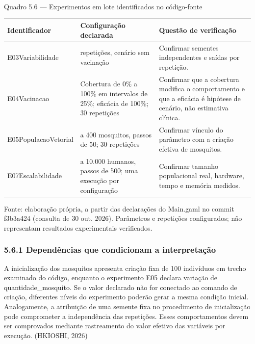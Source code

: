 Quadro 5.6 --- Experimentos em lote identificados no código-fonte

\begin{longtable}[]{@{}
  >{\raggedright\arraybackslash}p{}
  >{\raggedright\arraybackslash}p{}
  >{\raggedright\arraybackslash}p{}@{}}
\toprule\noalign{}
\begin{minipage}[b]{\linewidth}\raggedright
\textbf{Identificador}
\end{minipage} & \begin{minipage}[b]{\linewidth}\raggedright
\textbf{Configuração declarada}
\end{minipage} & \begin{minipage}[b]{\linewidth}\raggedright
\textbf{Questão de verificação}
\end{minipage} \\
\midrule\noalign{}
\endhead
\bottomrule\noalign{}
\endlastfoot
E03Variabilidade & 30 repetições, cenário sem vacinação & Confirmar
sementes independentes e saídas por repetição. \\
E04Vacinacao & Cobertura de 0\% a 100\% em intervalos de 25\%; eficácia
de 100\%; 30 repetições & Confirmar que a cobertura modifica o
comportamento e que a eficácia é hipótese de cenário, não estimativa
clínica. \\
E05PopulacaoVetorial & 50 a 400 mosquitos, passos de 50; 30 repetições &
Confirmar vínculo do parâmetro com a criação efetiva de mosquitos. \\
E07Escalabilidade & 500 a 10.000 humanos, passos de 500; uma execução
por configuração & Confirmar tamanho populacional real, hardware, tempo
e memória medidos. \\
\end{longtable}

Fonte: elaboração própria, a partir das declarações do Main.gaml no
commit f3b3a424 (consulta de 30 out. 2026). Parâmetros e repetições
configurados; não representam resultados experimentais verificados.

\subsubsection{5.6.1 Dependências que condicionam a
interpretação}\label{dependuxeancias-que-condicionam-a-interpretauxe7uxe3o}

A inicialização dos mosquitos apresenta criação fixa de 100 indivíduos
em trecho examinado do código, enquanto o experimento E05 declara
variação de quantidade\_mosquito. Se o valor declarado não for conectado
ao comando de criação, diferentes níveis do experimento poderão gerar a
mesma condição inicial. Analogamente, a atribuição de uma semente fixa
no procedimento de inicialização pode comprometer a independência das
repetições. Esses comportamentos devem ser comprovados mediante
rastreamento do valor efetivo das variáveis por execução. (HKIOSHI,
2026)

